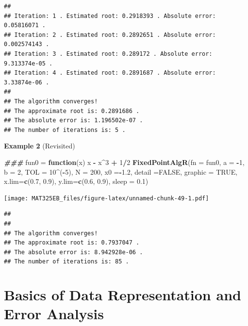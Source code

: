 \documentclass[
]{book}
\newenvironment{Shaded}{\begin{snugshade}}{\end{snugshade}}
\newcommand{\AttributeTok}[1]{\textcolor[rgb]{0.13,0.29,0.53}{#1}}
\newcommand{\ConstantTok}[1]{\textcolor[rgb]{0.56,0.35,0.01}{#1}}
\newcommand{\ControlFlowTok}[1]{\textcolor[rgb]{0.13,0.29,0.53}{\textbf{#1}}}
\newcommand{\DecValTok}[1]{\textcolor[rgb]{0.00,0.00,0.81}{#1}}
\newcommand{\DocumentationTok}[1]{\textcolor[rgb]{0.56,0.35,0.01}{\textbf{\textit{#1}}}}
\newcommand{\FloatTok}[1]{\textcolor[rgb]{0.00,0.00,0.81}{#1}}
\newcommand{\FunctionTok}[1]{\textcolor[rgb]{0.13,0.29,0.53}{\textbf{#1}}}
\newcommand{\NormalTok}[1]{#1}
\newcommand{\OtherTok}[1]{\textcolor[rgb]{0.56,0.35,0.01}{#1}}
\newcommand{\SpecialCharTok}[1]{\textcolor[rgb]{0.81,0.36,0.00}{\textbf{#1}}}
\begin{document}
\begin{verbatim}
## 
## Iteration: 1 . Estimated root: 0.2918393 . Absolute error: 0.05816071 .
## Iteration: 2 . Estimated root: 0.2892651 . Absolute error: 0.002574143 .
## Iteration: 3 . Estimated root: 0.289172 . Absolute error: 9.313374e-05 .
## Iteration: 4 . Estimated root: 0.2891687 . Absolute error: 3.33874e-06 .
## 
## The algorithm converges!
## The approximate root is: 0.2891686 .
## The absolute error is: 1.196502e-07 .
## The number of iterations is: 5 .
\end{verbatim}

\hfill\break

\textbf{Example 2} (Revisited)

\begin{Shaded}
\begin{Highlighting}[]
\DocumentationTok{\#\#\#}
\NormalTok{fun0 }\OtherTok{=} \ControlFlowTok{function}\NormalTok{(x) x }\SpecialCharTok{{-}}\NormalTok{ x}\SpecialCharTok{\^{}}\DecValTok{3} \SpecialCharTok{+} \DecValTok{1}\SpecialCharTok{/}\DecValTok{2}
\FunctionTok{FixedPointAlgR}\NormalTok{(}\AttributeTok{fn =}\NormalTok{ fun0, }\AttributeTok{a =} \SpecialCharTok{{-}}\DecValTok{1}\NormalTok{, }\AttributeTok{b =} \DecValTok{2}\NormalTok{, }\AttributeTok{TOL =} \DecValTok{10}\SpecialCharTok{\^{}}\NormalTok{(}\SpecialCharTok{{-}}\DecValTok{5}\NormalTok{), }\AttributeTok{N =} \DecValTok{200}\NormalTok{, }
               \AttributeTok{x0 =}\SpecialCharTok{{-}}\FloatTok{1.2}\NormalTok{, }\AttributeTok{detail =}\ConstantTok{FALSE}\NormalTok{, }\AttributeTok{graphic =} \ConstantTok{TRUE}\NormalTok{, }
               \AttributeTok{x.lim=}\FunctionTok{c}\NormalTok{(}\FloatTok{0.7}\NormalTok{, }\FloatTok{0.9}\NormalTok{), }\AttributeTok{y.lim=}\FunctionTok{c}\NormalTok{(}\FloatTok{0.6}\NormalTok{, }\FloatTok{0.9}\NormalTok{), }\AttributeTok{sleep =} \FloatTok{0.1}\NormalTok{)}
\end{Highlighting}
\end{Shaded}

\texttt{[image: MAT325EB\_files/figure-latex/unnamed-chunk-49-1.pdf]}

\begin{verbatim}
## 
## 
## The algorithm converges!
## The approximate root is: 0.7937047 .
## The absolute error is: 8.942928e-06 .
## The number of iterations is: 85 .
\end{verbatim}

\hypertarget{basics-of-data-representation-and-error-analysis}{%
\chapter{Basics of Data Representation and Error Analysis}\label{basics-of-data-representation-and-error-analysis}}
\end{document}
